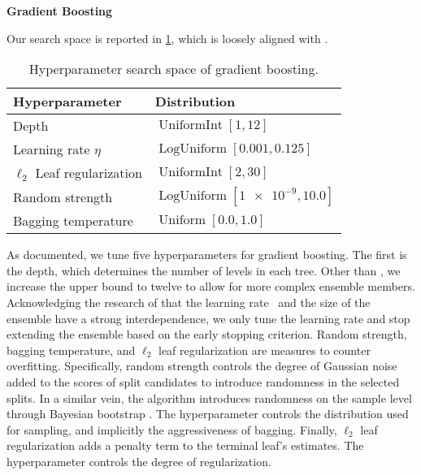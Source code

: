 \textbf{Gradient Boosting}

Our search space is reported in \cref{tab:hyperparameter-space-gbm}, which is loosely aligned with \textcite[][sup.]{gorishniyRevisitingDeepLearning2021}.

\begin{table}[!ht]
    \centering
    \caption[Hyperparameter Search Space of Gradient Boosting]{Hyperparameter search space of gradient boosting.}
    \label{tab:hyperparameter-space-gbm}
    \begin{tabular}{@{}ll@{}}
        \toprule
        Hyperparameter               & Distribution                                  \\ \midrule
        Depth                        & $\operatorname{UniformInt}[1,12]$             \\
        Learning rate $\eta$         & $\operatorname{LogUniform}[0.001, 0.125]$     \\
        $\ell_2$ Leaf regularization & $\operatorname{UniformInt}[2, 30]$            \\
        Random strength              & $\operatorname{LogUniform}[\num{1e-9}, 10.0]$ \\
        Bagging temperature          & $\operatorname{Uniform}[0.0, 1.0]$            \\ \bottomrule
    \end{tabular}
\end{table}

As documented, we tune five hyperparameters for gradient boosting. The first is the depth, which determines the number of levels in each tree. Other than \textcite[][sup.]{gorishniyRevisitingDeepLearning2021}, we increase the upper bound to twelve to allow for more complex ensemble members. Acknowledging the research of \textcite[][1203]{friedmanGreedyFunctionApproximation2001} that the learning rate \eta~and the size of the ensemble have a strong interdependence, we only tune the learning rate and stop extending the ensemble based on the early stopping criterion. Random strength, bagging temperature, and $\ell_2$ leaf regularization are measures to counter overfitting. Specifically, random strength controls the degree of Gaussian noise added to the scores of split candidates to introduce randomness in the selected splits. In a similar vein, the algorithm introduces randomness on the sample level through Bayesian bootstrap \autocite[][130--131]{rubinBayesianBootstrap1981}. The hyperparameter controls the distribution used for sampling, and implicitly the aggressiveness of bagging. Finally, $\ell_2$ leaf regularization adds a penalty term to the terminal leaf's estimates. The hyperparameter controls the degree of regularization.

